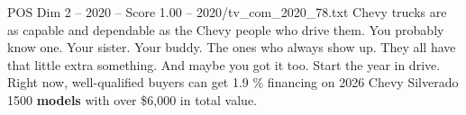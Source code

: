 \begin{textsample}{POS Dim 2 – 2020 – Score 1.00 – 2020/tv\_com\_2020\_78.txt}  \label{ex:f2_pos_079}
Chevy trucks are as capable and dependable as the Chevy people who drive them.
You probably know one.
Your sister.
Your buddy.
The ones who always show up.
They all have that little extra something.
And maybe you got it too.
Start the year in drive.
Right now, well-qualified buyers can get 1.9 \% financing on 2026 Chevy Silverado 1500 \textbf{models} with over \$6,000 in total value.

\end{textsample}
